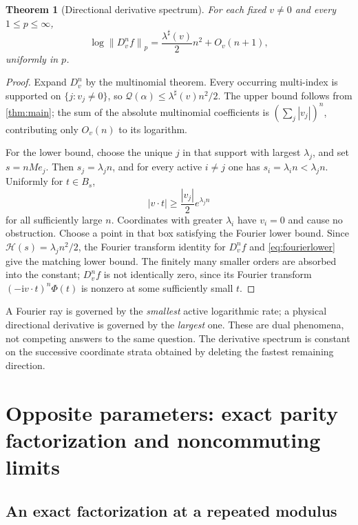 \documentclass[11pt,a4paper]{article}
\numberwithin{equation}{section}
\newtheorem{theorem}{Theorem}[section]
\theoremstyle{definition}
\theoremstyle{remark}\newtheorem{remark}[theorem]{Remark}
\newcommand{\ii}{\mathrm i}
\newcommand{\He}{\mathcal H}
\newcommand{\Qf}{\mathcal Q}
\newcommand{\norm}[1]{\left\lVert #1\right\rVert}
\begin{document}
\begin{theorem}[Directional derivative spectrum]
\label{thm:directional}
For each fixed $v\ne0$ and every $1\le p\le\infty$,
\begin{equation}
 \log\norm{D_v^nf}_p=\frac{\lambda^\sharp(v)}2n^2+O_v(n+1),
 \label{eq:directional}
\end{equation}
uniformly in $p$.
\end{theorem}
\begin{proof}
Expand $D_v^n$ by the multinomial theorem. Every occurring multi-index is
supported on $\{j:v_j\ne0\}$, so
$\Qf(\alpha)\le\lambda^\sharp(v)n^2/2$. The upper bound follows from
\cref{thm:main}; the sum of the absolute multinomial coefficients is
$(\sum_j|v_j|)^n$, contributing only $O_v(n)$ to its logarithm.

For the lower bound, choose the unique $j$ in that support with largest
$\lambda_j$, and set $s=nMe_j$. Then $s_j=\lambda_jn$, and for every active
$i\ne j$ one has $s_i=\lambda_in<\lambda_jn$. Uniformly for $t\in B_s$,
\[
 |v\cdot t|\ge\frac{|v_j|}{2}e^{\lambda_jn}
\]
for all sufficiently large $n$. Coordinates with greater $\lambda_i$ have
$v_i=0$ and cause no obstruction. Choose a point in that box satisfying the
Fourier lower bound. Since $\He(s)=\lambda_jn^2/2$, the Fourier transform
identity for $D_v^nf$ and \eqref{eq:fourierlower} give the matching lower
bound. The finitely many smaller orders are absorbed into the constant;
$D_v^nf$ is not identically zero, since its Fourier transform
$(-\ii v\cdot t)^n\Phi(t)$ is nonzero at some sufficiently small $t$.
\end{proof}

A Fourier ray is governed by the \emph{smallest} active logarithmic rate;
a physical directional derivative is governed by the \emph{largest} one.
These are dual phenomena, not competing answers to the same question.
The derivative spectrum is constant on the successive coordinate strata
obtained by deleting the fastest remaining direction.

\section{Opposite parameters: exact parity factorization and noncommuting limits}
\label{sec:resonance}

\subsection{An exact factorization at a repeated modulus}
\end{document}
